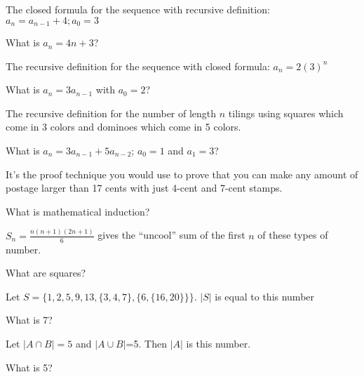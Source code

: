 \documentclass[10pt]{exam}
\begin{document}
\begin{questions}
\question The closed formula for the sequence with recursive definition: \(a_n=a_{n-1}+4; a_0=3\)
\begin{solution}
	What is \(a_n=4n+3\)?
\end{solution}

\question The recursive definition for the sequence with closed formula: \(a_n=2(3)^n \)
\begin{solution}
	What is \(a_n=3a_{n-1}\) with \(a_0=2\)?
\end{solution}


\question The recursive definition for the number of length $n$ tilings using squares which come in 3 colors and dominoes which come in 5 colors.

\begin{solution}
	What is $a_n = 3a_{n-1} + 5 a_{n-2}$; $a_0 = 1$ and $a_1 = 3$?
\end{solution}












\newpage
















\question It's the proof technique you would use to prove that you can make any amount of postage larger than 17 cents with just 4-cent and 7-cent stamps.

\begin{solution}
	What is mathematical induction?
\end{solution}


\question \(S_n=\frac{n(n+1)(2n+1)}{6}\) gives the ``uncool'' sum of the first \(n\) of these types of number.
\begin{solution}
	What are squares?
\end{solution}


\question Let \(S = \{1, 2, 5, 9, 13, \{3, 4, 7\}, \{6,\{16, 20\}\}\}\). \(|S|\) is equal to this number
\begin{solution}
	What is 7?
\end{solution}

\question Let \(|A\cap B|=5\) and \(|A\cup B|\)=5. Then \(|A|\) is this number.
\begin{solution}
	What is 5?
\end{solution}


\end{questions}
\end{document}

